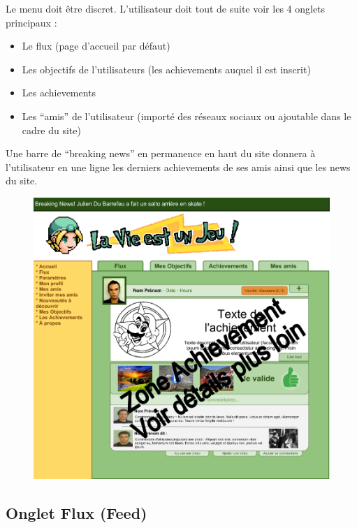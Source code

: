\documentclass{life-fr}
\begin{document}
Le menu doit être discret. L'utilisateur doit tout de suite voir les 4 onglets principaux :

\begin{itemize}
  \item Le flux (page d'accueil par défaut)
  \item Les objectifs de l'utilisateurs (les achievements auquel il est inscrit)
  \item Les achievements
  \item Les “amis” de l'utilisateur (importé des réseaux sociaux ou ajoutable dans le cadre du site)
\end{itemize}

Une barre de “breaking news” en permanence en haut du site donnera à l'utilisateur en une ligne les derniers achievements de ses amis ainsi que les news du site.

\begin{figure}[H]
  \begin{center}
    \includegraphics[width=15cm]{img/accueil.png}
  \end{center}
\end{figure}


\subsection{Onglet Flux (Feed)}
\end{document}

